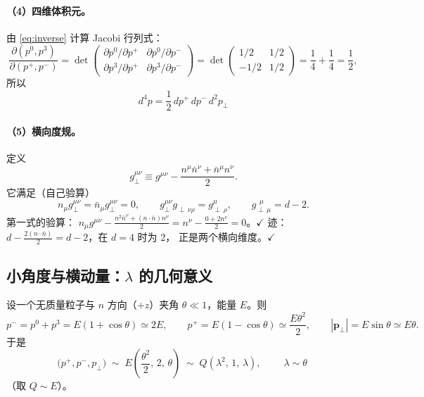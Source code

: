 \documentclass[UTF8,a4paper,11pt]{ctexart}
\theoremstyle{definition}
\theoremstyle{remark}
\theoremstyle{plain}
\newcommand{\pperp}{\bm{p}_\perp}
\begin{document}
\paragraph{（4）四维体积元。}由 \eqref{eq:inverse} 计算 Jacobi 行列式：
\begin{equation}
  \frac{\partial(p^0,p^3)}{\partial(p^+,p^-)}
  =\det\begin{pmatrix}
    \partial p^0/\partial p^+ & \partial p^0/\partial p^-\\[2pt]
    \partial p^3/\partial p^+ & \partial p^3/\partial p^-
  \end{pmatrix}
  =\det\begin{pmatrix} 1/2 & 1/2\\ -1/2 & 1/2\end{pmatrix}
  =\frac14+\frac14=\frac12 ,
\end{equation}
所以
\begin{equation}
  \boxed{\;d^4p=\frac12\,dp^+\,dp^-\,d^2p_\perp\;}
  \label{eq:volume}
\end{equation}

\paragraph{（5）横向度规。}定义
\begin{equation}
  g_\perp^{\mu\nu}\equiv g^{\mu\nu}-\frac{n^\mu\bar n^\nu+\bar n^\mu n^\nu}{2} .
  \label{eq:gperp}
\end{equation}
它满足（自己验算）
\begin{equation}
  n_\mu g_\perp^{\mu\nu}=\bar n_\mu g_\perp^{\mu\nu}=0,
  \qquad
  g_\perp^{\mu\nu}g_{\perp\,\nu\rho}=g^{\mu}_{\perp\,\rho},
  \qquad
  g_{\perp\,\mu}^{\ \ \mu}=d-2 .
  \label{eq:gperptrace}
\end{equation}
第一式的验算：
$n_\mu g^{\mu\nu}-\frac{n^2\bar n^\nu+(n\cdot\bar n)n^\nu}{2}
=n^\nu-\frac{0+2n^\nu}{2}=0$。$\checkmark$
迹：$d-\frac{2(n\cdot\bar n)}{2}=d-2$，在 $d=4$ 时为 2，
正是两个横向维度。$\checkmark$

\subsection{小角度与横动量：$\lambda$ 的几何意义}
\label{subsec:angle}

设一个无质量粒子与 $n$ 方向（$+z$）夹角 $\theta\ll1$，能量 $E$。则
\begin{equation}
  p^-=p^0+p^3=E(1+\cos\theta)\simeq 2E,
  \qquad
  p^+=E(1-\cos\theta)\simeq \frac{E\theta^2}{2},
  \qquad
  |\pperp|=E\sin\theta\simeq E\theta .
\end{equation}
于是
\begin{equation}
  \big(p^+,p^-,p_\perp\big)
  \;\sim\; E\left(\frac{\theta^2}{2},\,2,\,\theta\right)
  \;\sim\; Q\left(\lambda^2,\,1,\,\lambda\right),
  \qquad
  \boxed{\;\lambda\sim\theta\;}
  \label{eq:lambdatheta}
\end{equation}
（取 $Q\sim E$）。
\end{document}
